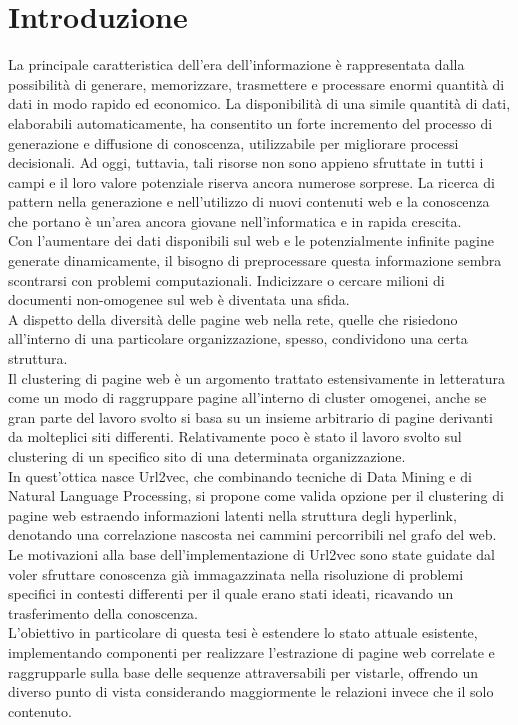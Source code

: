 
\cleardoublepage
\chapter*{Introduzione}

La principale caratteristica dell'era dell'informazione è rappresentata dalla possibilità di generare, memorizzare, trasmettere e processare enormi quantità di dati in modo rapido ed economico. La disponibilità di una simile quantità di dati, elaborabili automaticamente, ha consentito un forte incremento del processo di generazione e diffusione di conoscenza, utilizzabile per migliorare processi decisionali. Ad oggi, tuttavia, tali risorse non sono appieno sfruttate in tutti i campi e il loro valore potenziale riserva ancora numerose sorprese. La ricerca di pattern nella generazione e nell'utilizzo di nuovi contenuti web e la conoscenza che portano è un'area ancora giovane nell'informatica e in rapida crescita. 
\\
Con l'aumentare dei dati disponibili sul web e le potenzialmente infinite pagine generate dinamicamente, il bisogno di preprocessare questa informazione sembra scontrarsi con problemi computazionali. Indicizzare o cercare milioni di documenti non-omogenee sul web è diventata una sfida.
\\
A dispetto della diversità delle pagine web nella rete, quelle che risiedono all'interno di una particolare organizzazione, spesso, condividono una certa struttura.
\\
Il clustering di pagine web è un argomento trattato estensivamente in letteratura come un modo di raggruppare pagine  all'interno di cluster omogenei, anche se gran parte del lavoro svolto si basa su un insieme arbitrario di pagine derivanti da molteplici siti differenti. Relativamente poco è stato il lavoro svolto sul clustering di un specifico sito di una determinata organizzazione.
\\
In quest'ottica nasce Url2vec, che combinando tecniche di Data Mining e di Natural Language Processing, si propone come valida opzione per il clustering di pagine web estraendo informazioni latenti nella struttura degli hyperlink, denotando una correlazione nascosta nei cammini percorribili nel grafo del web.
\\
Le motivazioni alla base dell'implementazione di Url2vec sono state guidate dal voler sfruttare conoscenza già immagazzinata nella risoluzione di problemi specifici in contesti differenti per il quale erano stati ideati, ricavando un trasferimento della conoscenza.
\\
L'obiettivo in particolare di questa tesi è estendere lo stato attuale esistente, implementando componenti per realizzare l'estrazione di pagine web correlate e raggrupparle sulla base delle sequenze attraversabili per vistarle, offrendo un diverso punto di vista considerando maggiormente le relazioni invece che il solo contenuto.

